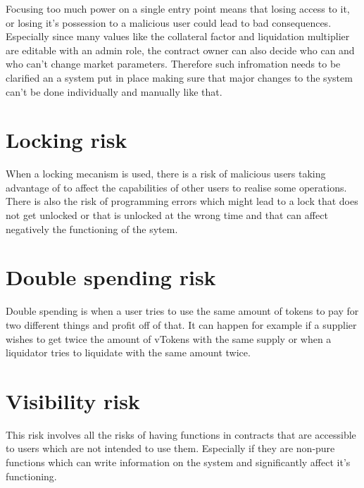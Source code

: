 Focusing too much power on a single entry point means that losing access to it, or losing it's possession to a malicious user could lead to bad consequences. Especially since many values like the collateral factor and liquidation multiplier are editable with an admin role, the contract owner can also decide who can and who can't change market parameters. Therefore such infromation needs to be clarified an a system put in place making sure that major changes to the system can't be done individually and manually like that.

\section{Locking risk} %

When a locking mecanism is used, there is a risk of malicious users taking advantage of to affect the capabilities of other users to realise some operations. There is also the risk of programming errors which might lead to a lock that does not get unlocked or that is unlocked at the wrong time and that can affect negatively the functioning of the sytem. 

\section{Double spending risk} %

Double spending is when a user tries to use the same amount of tokens to pay for two different things and profit off of that. It can happen for example if a supplier wishes to get twice the amount of vTokens with the same supply or when a liquidator tries to liquidate with the same amount twice. 

 \section{Visibility risk} %

This risk involves all the risks of having functions in contracts that are accessible to users which are not intended to use them. Especially if they are non-pure functions which can write information on the system and significantly affect it's functioning.
